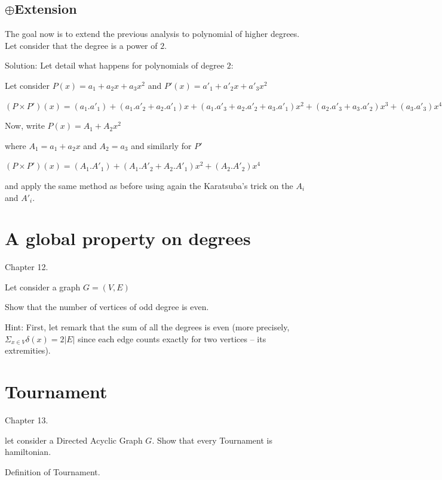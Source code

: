 \documentclass{article}[12pt]
\begin{document}
\subsection{$\oplus$Extension}

The goal now is to extend the previous analysis to polynomial of higher degrees.
Let consider that the degree is a power of $2$.
\bigskip

Solution:
Let detail what happens for polynomials of degree $2$:

Let consider $P(x) = a_1 + a_2 x + a_3 x^2$ and $P'(x) = a'_1 + a'_2 x + a'_3 x^2$

$(P \times P')(x) = (a_1.a'_1) + (a_1.a'_2 + a_2.a'_1) x + (a_1.a'_3 + a_2.a'_2 + a_3.a'_1) x^2 + (a_2.a'_3 + a_3.a'_2) x^3 +  (a_3.a'_3) x^4$
\bigskip

Now, write $P(x) = A_1 + A_2 x^2$ 

where $A_1 = a_1 + a_2 x$ and $A_2 = a_3$ and similarly for $P'$

$(P \times P')(x) = (A_1.A'_1) + (A_1.A'_2 + A_2.A'_1) x^2 + (A_2.A'_2) x^4$ 

and apply the same method as before using again the Karatsuba's trick on the $A_i$ and $A'_i$.



\section{A global property on degrees}

Chapter 12.

Let consider a graph $G=(V,E)$

Show that the number of vertices of odd degree is even.

Hint:
First, let remark that the sum of all the degrees is even
(more precisely, $\Sigma_{x \in V} \delta(x) = 2 |E|$ since each edge counts exactly for two vertices -- its extremities). 


\section{Tournament}

Chapter 13.

let consider a Directed Acyclic Graph $G$.
Show that every Tournament is hamiltonian.

Definition of Tournament.
\end{document}

